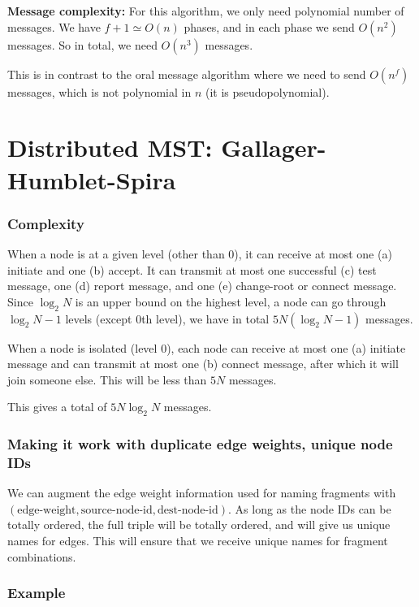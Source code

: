 \documentclass{article}
\begin{document}
\textbf{Message complexity:}
For this algorithm, we only need polynomial number of messages. We have
$f+1 \simeq O(n)$ phases, and in each phase we send $O(n^2)$ messages. So in total, 
we need $O(n^3)$ messages. 

This is in contrast to the oral message algorithm where we need to
send $O(n^f)$ messages, which is not polynomial in $n$ (it is pseudopolynomial).




\section{Distributed MST: Gallager-Humblet-Spira}
\subsubsection{Complexity}

When a node is at a given level (other than 0), it can
receive at most one (a) initiate and one (b) accept. It can transmit at most one
successful (c) test message, one (d) report message, and one (e) change-root or connect
message. Since $\log_2 N$ is an upper bound on the highest level, a node can go
through $\log_2 N - 1$ levels (except 0th level), we have in total $5N (\log_2 N - 1)$ messages. 

When a node is isolated (level 0), each node can receive at most one (a) initiate
message and can transmit at most one (b) connect message, after which it will join
someone else. This will be less than $5N$ messages.

This gives a total of $5N \log_2 N$ messages.






\subsubsection{Making it work with duplicate edge weights, unique node IDs}
We can augment the edge weight information used for naming fragments
with $(\text{edge-weight}, \text{source-node-id}, \text{dest-node-id})$. As
long as the node IDs can be totally ordered, the full triple will be
totally ordered, and will give us unique names for edges. This will ensure
that we receive unique names for fragment combinations.

\subsubsection{Example}
\end{document}
